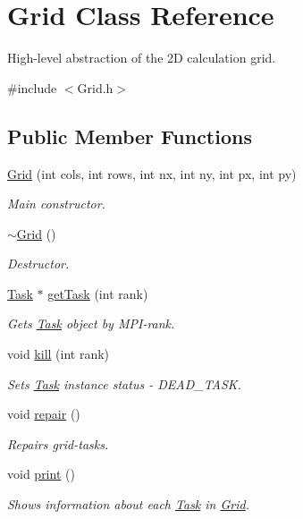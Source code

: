 \hypertarget{classGrid}{}\section{Grid Class Reference}
\label{classGrid}


High-\/level abstraction of the 2D calculation grid.  




{\ttfamily \#include $<$Grid.\+h$>$}

\subsection*{Public Member Functions}
\begin{DoxyCompactItemize}
\item 
\hyperlink{classGrid_a2d5d845fa954d901ecbcd278e7b45aae}{Grid} (int cols, int rows, int nx, int ny, int px, int py)
\begin{DoxyCompactList}\small\item\em Main constructor. \end{DoxyCompactList}\item 
\hyperlink{classGrid_a3661d0a7f998caaaf8627d7a67072116}{$\sim$\+Grid} ()
\begin{DoxyCompactList}\small\item\em Destructor. \end{DoxyCompactList}\item 
\hyperlink{classTask}{Task} $\ast$ \hyperlink{classGrid_a7b02e5a724228ddae4eacc836f6afcba}{get\+Task} (int rank)
\begin{DoxyCompactList}\small\item\em Gets \hyperlink{classTask}{Task} object by M\+P\+I-\/rank. \end{DoxyCompactList}\item 
void \hyperlink{classGrid_af6b2bb427269c20153b51c96571d67a6}{kill} (int rank)
\begin{DoxyCompactList}\small\item\em Sets \hyperlink{classTask}{Task} instance status -\/ \textquotesingle{}D\+E\+A\+D\+\_\+\+T\+A\+SK\textquotesingle{}. \end{DoxyCompactList}\item 
void \hyperlink{classGrid_a45bca1a92d2e19536c7d7c23db9fe665}{repair} ()
\begin{DoxyCompactList}\small\item\em Repairs grid-\/tasks. \end{DoxyCompactList}\item 
void \hyperlink{classGrid_a8f86511ed049044225a4116dd1c2a2e2}{print} ()
\begin{DoxyCompactList}\small\item\em Shows information about each \hyperlink{classTask}{Task} in \hyperlink{classGrid}{Grid}. \end{DoxyCompactList}\end{DoxyCompactItemize}
